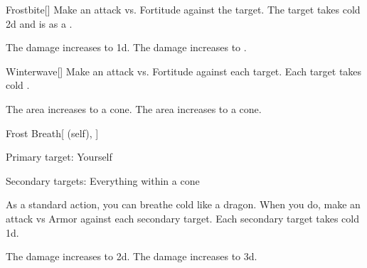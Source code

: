 \lowercase{\hypertarget{spell:Frostbite}{}}\label{spell:Frostbite}
\begin{freeability}[Rank 3]{\hypertarget{spell:Frostbite}{Frostbite}}[]
Make an attack vs. Fortitude against the target.
\hit The target takes cold  \minus2d and is  as a .

\rankline
{} The damage increases to  \minus1d.
 The damage increases to .
\end{freeability}
\vspace{0.25em}



\lowercase{\hypertarget{spell:Winterwave}{}}\label{spell:Winterwave}
\begin{freeability}[Rank 3]{\hypertarget{spell:Winterwave}{Winterwave}}[]
Make an attack vs. Fortitude against each target.
\hit Each target takes cold .

\rankline
{} The area increases to a \areahuge cone.
 The area increases to a \areaext cone.
\end{freeability}
\vspace{0.25em}



\lowercase{\hypertarget{spell:Frost Breath}{}}\label{spell:Frost Breath}
\begin{attuneability}[Rank 4]{\hypertarget{spell:Frost Breath}{Frost Breath}}[ (self), ]

Primary target: Yourself
\par\noindent
Secondary targets: Everything within a \arealarge cone

As a standard action, you can breathe cold like a dragon.
When you do, make an attack vs Armor against each secondary target.
\hit Each secondary target takes cold  \plus1d.

\rankline
{} The damage increases to  \plus2d.
 The damage increases to  \plus3d.
\end{attuneability}
\vspace{0.25em}



